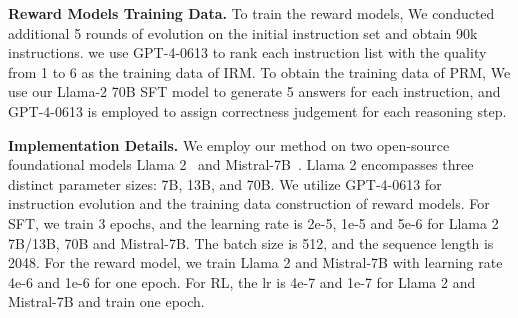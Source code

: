 \textbf{Reward Models Training Data.} 
To train the reward models, We conducted additional 5 rounds of evolution on the initial instruction set and obtain 90k instructions. we use GPT-4-0613 to rank each instruction list with the quality  from 1 to 6 as the training data of IRM. To obtain the training data of PRM, We use our Llama-2 70B SFT model to generate 5 answers for each instruction, and GPT-4-0613 is employed to assign correctness judgement for each reasoning step.

\textbf{Implementation Details.}
We employ our method on two open-source foundational models Llama 2~\citep{touvron2023llama2} and Mistral-7B~\citep{jiang2023mistral}. Llama 2 encompasses three distinct parameter sizes: 7B, 13B, and 70B. We utilize GPT-4-0613 for instruction evolution and  the training data construction of reward models. For SFT, we train 3 epochs, and the learning rate is 2e-5, 1e-5 and 5e-6 for Llama 2 7B/13B, 70B and Mistral-7B. The batch size is 512, and the sequence length is 2048.
 For the reward model, we train Llama 2 and Mistral-7B with learning rate 4e-6 and 1e-6 for one epoch. For RL, the lr is 4e-7 and 1e-7 for Llama 2 and Mistral-7B and train one epoch.

    

